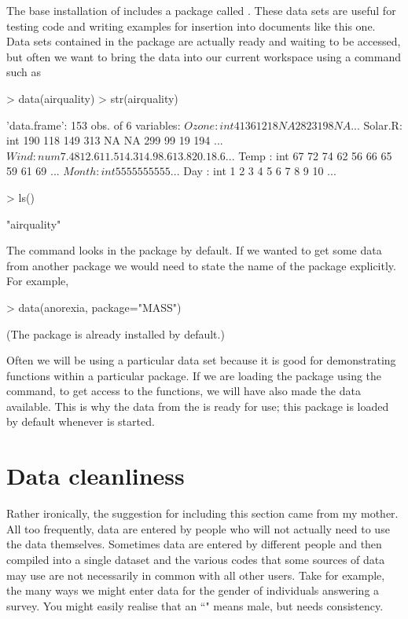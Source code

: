  
The base installation of \R{} includes a package called . These data sets are useful for testing code and writing examples for insertion into documents like this one. Data sets contained in the  package are actually ready and waiting to be accessed, but often we want to bring the data into our current workspace using a command such as 
\begin{Schunk}
\begin{Sinput}
> data(airquality) 
> str(airquality) 
\end{Sinput}
\begin{Soutput}
'data.frame':	153 obs. of  6 variables:
 $ Ozone  : int  41 36 12 18 NA 28 23 19 8 NA ...
 $ Solar.R: int  190 118 149 313 NA NA 299 99 19 194 ...
 $ Wind   : num  7.4 8 12.6 11.5 14.3 14.9 8.6 13.8 20.1 8.6 ...
 $ Temp   : int  67 72 74 62 56 66 65 59 61 69 ...
 $ Month  : int  5 5 5 5 5 5 5 5 5 5 ...
 $ Day    : int  1 2 3 4 5 6 7 8 9 10 ...
\end{Soutput}
\begin{Sinput}
> ls() 
\end{Sinput}
\begin{Soutput}
[1] "airquality"
\end{Soutput}
\end{Schunk}
The  command looks in the  package by default. If we wanted to get some data from another package we would need to state the name of the package explicitly. For example, 
\begin{Schunk}
\begin{Sinput}
> data(anorexia, package="MASS") 
\end{Sinput}
\end{Schunk}
(The  package is already installed by default.)  
 
Often we will be using a particular data set because it is good for demonstrating functions within a particular package. If we are loading the package using the  command, to get access to the functions, we will have also made the data available. This is why the data from the  is ready for use; this package is loaded by default whenever \R{} is started. 
 
 
\section{Data cleanliness} 
 
Rather ironically, the suggestion for including this section came from my mother. All too frequently, data are entered by people who will not actually need to use the data themselves. Sometimes data are entered by different people and then compiled into a single dataset and the various codes that some sources of data may use are not necessarily in common with all other users. Take for example, the many ways we might enter data for the gender of individuals answering a survey. You might easily realise that an ``" means male, but \R{} needs consistency. 
 
